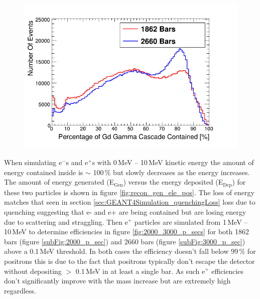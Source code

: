 \begin{figure}[!h]
 \centering
 \includegraphics[width=0.7\linewidth]{Chapter4/Figs/cascadeContainmentCompare.png}
 \label{fig:containment_comparison}
\end{figure} 

When simulating e$^-$s and e$^+$s with 0\,MeV -- 10\,MeV kinetic energy the amount of energy contained inside is $\sim$ 100\,\% but slowly decreases as the energy increases. The amount of energy generated (E$_\textrm{{Gen}}$) versus the energy deposited  (E$_\textrm{{Dep}}$) for these two particles is shown in figure \ref{fig:recon_gen_ele_pos}. The loss of energy matches that seen in section \ref{sec:GEANT4Simulation_quenchingLoss} loss due to quenching suggesting that e- and e+ are being contained but are losing energy due to scattering and straggling. Then e$^+$ particles are simulated from 1\,MeV -- 10\,MeV to determine efficiencies in figure \ref{fig:2000_3000_p_secs} for both 1862 bars (figure \ref{subFig:2000_p_sec}) and 2660 bars (figure \ref{subFig:3000_p_sec}) above a 0.1\,MeV threshold. In both cases the efficiency doesn't fall below 99\,\% for positrons this is due to the fact that positrons typically don't escape the detector without depositing $>$ 0.1\,MeV in at least a single bar. As such e$^+$ efficiencies don't significantly improve with the mass increase but are extremely high regardless.  

